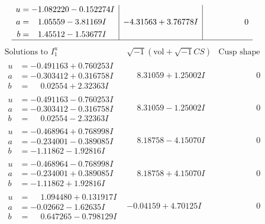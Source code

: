 \documentclass[1p]{elsarticle_modified}
\theoremstyle{definition}
\newcommand{\I}{\sqrt{-1}}
\begin{document}
$$\begin{array}{c|c|c}
\begin{aligned}
u &= -1.082220 - 0.152274 I \\
a &= \phantom{-}1.05559 - 3.81169 I \\
b &= \phantom{-}1.45512 - 1.53677 I\end{aligned}
 & -4.31563 + 3.76778 I & \phantom{-0.000000 } 0\\
 \hline 
 \end{array}$$\newpage$$\begin{array}{c|c|c}  
\text{Solutions to }I^u_{1}& \I (\text{vol} + \sqrt{-1}CS) & \text{Cusp shape}\\
 \hline 
\begin{aligned}
u &= -0.491163 + 0.760253 I \\
a &= -0.303412 + 0.316758 I \\
b &= \phantom{-}0.02554 + 2.32363 I\end{aligned}
 & \phantom{-}8.31059 + 1.25002 I & \phantom{-0.000000 } 0 \\ \hline\begin{aligned}
u &= -0.491163 - 0.760253 I \\
a &= -0.303412 - 0.316758 I \\
b &= \phantom{-}0.02554 - 2.32363 I\end{aligned}
 & \phantom{-}8.31059 - 1.25002 I & \phantom{-0.000000 } 0 \\ \hline\begin{aligned}
u &= -0.468964 + 0.768998 I \\
a &= -0.234001 - 0.389085 I \\
b &= -1.11862 - 1.92816 I\end{aligned}
 & \phantom{-}8.18758 - 4.15070 I & \phantom{-0.000000 } 0 \\ \hline\begin{aligned}
u &= -0.468964 - 0.768998 I \\
a &= -0.234001 + 0.389085 I \\
b &= -1.11862 + 1.92816 I\end{aligned}
 & \phantom{-}8.18758 + 4.15070 I & \phantom{-0.000000 } 0 \\ \hline\begin{aligned}
u &= \phantom{-}1.094480 + 0.131917 I \\
a &= -0.02662 - 1.62635 I \\
b &= \phantom{-}0.647265 - 0.798129 I\end{aligned}
 & -0.04159 + 4.70125 I & \phantom{-0.000000 } 0 \\ \hline\begin{aligned}

\end{aligned}
\end{array}$$
\end{document}
